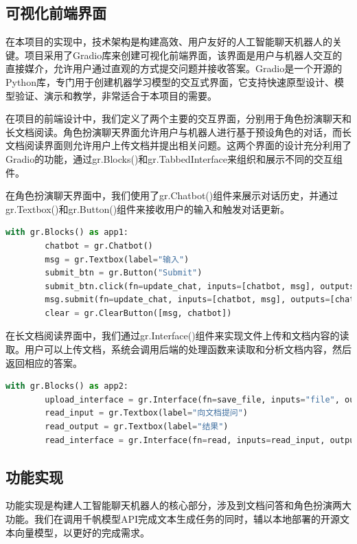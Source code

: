 \documentclass[lang=cn,a4paper,founder,bibend=bibtex,citestyle=gb7714-2015, bibstyle=gb7714-2015]{elegantpaper}
\begin{document}
\subsection{可视化前端界面} %

在本项目的实现中，技术架构是构建高效、用户友好的人工智能聊天机器人的关键。项目采用了Gradio库来创建可视化前端界面，该界面是用户与机器人交互的直接媒介，允许用户通过直观的方式提交问题并接收答案。Gradio是一个开源的Python库，专门用于创建机器学习模型的交互式界面，它支持快速原型设计、模型验证、演示和教学，非常适合于本项目的需要。

在项目的前端设计中，我们定义了两个主要的交互界面，分别用于角色扮演聊天和长文档阅读。角色扮演聊天界面允许用户与机器人进行基于预设角色的对话，而长文档阅读界面则允许用户上传文档并提出相关问题。这两个界面的设计充分利用了Gradio的功能，通过gr.Blocks()和gr.TabbedInterface来组织和展示不同的交互组件。

在角色扮演聊天界面中，我们使用了gr.Chatbot()组件来展示对话历史，并通过gr.Textbox()和gr.Button()组件来接收用户的输入和触发对话更新。

\begin{lstlisting}[language=python]
	with gr.Blocks() as app1:
		chatbot = gr.Chatbot()
		msg = gr.Textbox(label="输入")
		submit_btn = gr.Button("Submit")
		submit_btn.click(fn=update_chat, inputs=[chatbot, msg], outputs=[chatbot, msg])
		msg.submit(fn=update_chat, inputs=[chatbot, msg], outputs=[chatbot, msg])
		clear = gr.ClearButton([msg, chatbot])
\end{lstlisting}

在长文档阅读界面中，我们通过gr.Interface()组件来实现文件上传和文档内容的读取。用户可以上传文档，系统会调用后端的处理函数来读取和分析文档内容，然后返回相应的答案。

\begin{lstlisting}[language=python]
	with gr.Blocks() as app2:
		upload_interface = gr.Interface(fn=save_file, inputs="file", outputs="text")
		read_input = gr.Textbox(label="向文档提问")
		read_output = gr.Textbox(label="结果")
		read_interface = gr.Interface(fn=read, inputs=read_input, outputs=read_output)
\end{lstlisting}

\subsection{功能实现}

功能实现是构建人工智能聊天机器人的核心部分，涉及到文档问答和角色扮演两大功能。我们在调用千帆模型API完成文本生成任务的同时，辅以本地部署的开源文本向量模型，以更好的完成需求。
\end{document}
